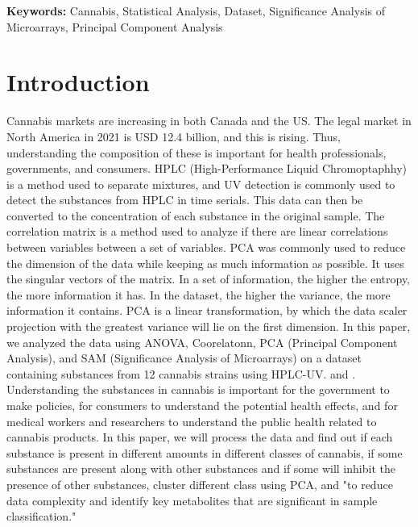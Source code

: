 \documentclass{article}
\begin{document}
\textbf{Keywords: } Cannabis, Statistical Analysis, Dataset, Significance Analysis of Microarrays, Principal Component Analysis
\section{Introduction}
Cannabis markets are increasing \cite{Lab Manuel} in both Canada and the US. The legal market in North America in 2021 is USD 12.4 billion, and this is rising. \cite{Market} Thus, understanding the composition of these is important for health professionals, governments, and consumers. HPLC (High-Performance Liquid Chromoptaphhy) is a method used to separate mixtures, and UV detection is commonly used to detect the  substances from HPLC in time serials. This data can then be converted to the concentration of each substance in the original sample. The correlation matrix is a method used to analyze if there are linear correlations between variables between a set of variables. PCA was commonly used to reduce the dimension of the data while keeping as much information as possible. It uses the singular vectors of the matrix. \cite{PCA} In a set of information, the higher the entropy, the more information it has. \cite{info} In the dataset, the higher the variance, the more information it contains. PCA is a linear transformation, by which the data scaler projection with the greatest variance will lie on the first dimension. \cite{PCA} In this paper, we analyzed the data using ANOVA, Coorelatonn, PCA (Principal Component Analysis), and SAM (Significance Analysis of Microarrays) \cite{SAM} on a dataset containing substances from 12 cannabis strains using HPLC-UV. \cite{dataset1} and \cite{dataset2}. \\
Understanding the substances in cannabis is important for the government to make policies, for consumers to understand the potential health effects, and for medical workers and researchers to understand the public health related to cannabis products. In this paper, we will process the data and find out if each substance is present in different amounts in different classes of cannabis, if some substances are present along with other substances and if some will inhibit the presence of other substances, cluster different class using PCA, and "to reduce data complexity and identify key metabolites that are significant in sample classification." \cite{Lab Manuel}



\end{document}
